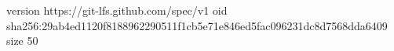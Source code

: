 version https://git-lfs.github.com/spec/v1
oid sha256:29ab4ed1120f8188962290511f1cb5e71e846ed5fac096231dc8d7568dda6409
size 50
